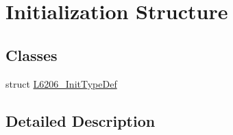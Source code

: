 \hypertarget{group___initialization___structure}{}\section{Initialization Structure}
\label{group___initialization___structure}
\subsection*{Classes}
\begin{DoxyCompactItemize}
\item 
struct \mbox{\hyperlink{struct_l6206___init_type_def}{L6206\+\_\+\+Init\+Type\+Def}}
\end{DoxyCompactItemize}


\subsection{Detailed Description}
